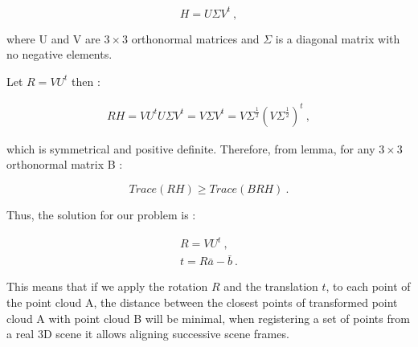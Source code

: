 \[ H = U \Sigma V^t \ , \]

\noindent where U and V are $3\times3$ orthonormal matrices and $\Sigma$ is a diagonal matrix with no negative elements.

Let $ R = V U^t $ then :

\begin{align*}
RH = VU^t U \Sigma V^t = V \Sigma V^t = V \Sigma^{\frac{1}{2}} (V \Sigma^{\frac{1}{2}})^t \ ,
\end{align*}

\noindent which is symmetrical and positive definite.
Therefore, from lemma, for any $3\times3$ orthonormal matrix B :

\[ Trace( R H ) \geq Trace( B R H ) \ . \]

Thus, the solution for our problem is :

\begin{align*}
R = V U^t \ , \\
t = R \bar{a} - \bar{b} \ .
\end{align*}


\noindent This means that if we apply the rotation $R$ and the translation $t$, to each point of the point cloud A, the distance between the
 closest points of 
transformed point cloud A with point cloud B will be minimal, when registering a set of points from a real 3D scene it allows aligning 
successive scene frames.
